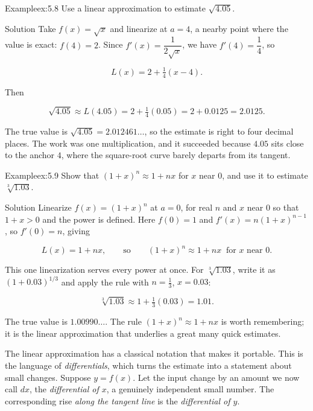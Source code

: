 \documentclass[a4paper,12pt,oneside]{memoir}
\begin{document}
\begin{workedexample}
\begin{envexample}{Example}{ex:5.8}{}
Use a linear approximation to estimate \(\sqrt{4.05}\).
\end{envexample}
\begin{envsolution}{Solution}{}{}
Take \(f(x) = \sqrt{x}\) and linearize at \(a = 4\), a nearby point where the value is exact: \(f(4) = 2\). Since \(f'(x) = \dfrac{1}{2\sqrt{x}}\), we have \(f'(4) = \dfrac{1}{4}\), so

\[ L(x) = 2 + \tfrac{1}{4}(x - 4). \]

Then

\[ \sqrt{4.05} \approx L(4.05) = 2 + \tfrac{1}{4}(0.05) = 2 + 0.0125 = 2.0125. \]

The true value is \(\sqrt{4.05} = 2.012461\ldots\), so the estimate is right to four decimal places. The work was one multiplication, and it succeeded because \(4.05\) sits close to the anchor \(4\), where the square-root curve barely departs from its tangent. \qedmark
\end{envsolution}
\end{workedexample}
\begin{workedexample}
\begin{envexample}{Example}{ex:5.9}{}
Show that \((1 + x)^{n} \approx 1 + nx\) for \(x\) near \(0\), and use it to estimate \(\sqrt[3]{1.03}\).
\end{envexample}
\begin{envsolution}{Solution}{}{}
Linearize \(f(x) = (1 + x)^{n}\) at \(a = 0\), for real \(n\) and \(x\) near \(0\) so that \(1 + x > 0\) and the power is defined. Here \(f(0) = 1\) and \(f'(x) = n(1 + x)^{n-1}\), so \(f'(0) = n\), giving

\[ L(x) = 1 + nx, \qquad \text{so} \qquad (1 + x)^{n} \approx 1 + nx \ \text{ for } x \text{ near } 0. \]

This one linearization serves every power at once. For \(\sqrt[3]{1.03}\), write it as \((1 + 0.03)^{1/3}\) and apply the rule with \(n = \tfrac{1}{3}\), \(x = 0.03\):

\[ \sqrt[3]{1.03} \approx 1 + \tfrac{1}{3}(0.03) = 1.01. \]

The true value is \(1.00990\ldots\). The rule \((1 + x)^{n} \approx 1 + nx\) is worth remembering; it is the linear approximation that underlies a great many quick estimates. \qedmark
\end{envsolution}
\end{workedexample}
The linear approximation has a classical notation that makes it portable. This is the language of \emph{differentials}, which turns the estimate into a statement about small changes. Suppose \(y = f(x)\). Let the input change by an amount we now call \(dx\), the \emph{differential of \(x\)}, a genuinely independent small number. The corresponding rise \emph{along the tangent line} is the \emph{differential of \(y\)}.
\end{document}
